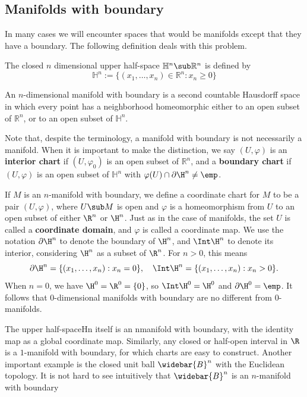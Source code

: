 \subsection{Manifolds with boundary}
In many cases we will encounter spaces that would be manifolds except that they have a boundary. The following definition deals with this problem.\par
The closed $n$ dimensional upper half-space $\mathbb{H}^n\sub\mathbb{R}^n$ is defined by
\[\mathbb{H}^n:=\{(x_1,\dots,x_n)\in\mathbb{R}^n:x_n\geq0\}\]
\begin{definition}
An $n$-dimensional manifold with boundary is a second countable Hausdorff space in which every point has a neighborhood homeomorphic either to an open subset of $\mathbb{R}^n$, or to an open subset of $\mathbb{H}^n$.
\end{definition}
Note that, despite the terminology, a manifold with boundary is not necessarily a manifold. When it is important to make the distinction, we say $(U,\varphi)$ is an \textbf{interior chart} if $(U,\varphi_0)$ is an open subset of $\mathbb{R}^n$, and a \textbf{boundary chart} if $(U,\varphi)$ is an open subset of $\mathbb{H}^n$ with $\varphi(U)\cap\partial\H^n\neq\emp$.\par
If $M$ is an $n$-manifold with boundary, we define a coordinate chart for $M$ to be a pair $(U,\varphi)$, where $U\sub M$ is open and $\varphi$ is a homeomorphism from $U$ to an open subset of either $\R^n$ or $\H^n$. Just as in the case of manifolds, the set $U$ is called a \textbf{coordinate domain}, and $\varphi$ is called a coordinate map. We use the notation $\partial\H^n$ to denote the boundary of $\H^n$, and $\Int\H^n$ to denote its interior, considering $\H^n$ as a subset of $\R^n$. For $n>0$, this means
\[\partial\H^n=\{(x_1,\dots,x_n):x_n=0\},\quad\Int\H^n=\{(x_1,\dots,x_n):x_n>0\}.\]
When $n=0$, we have $\H^0=\R^0=\{0\}$, so $\Int\H^0=\H^0$ and $\partial\H^0=\emp$. It follows that $0$-dimensional manifolds with boundary are no different from $0$-manifolds.
\begin{example}
The upper half-spaceHn itself is an nmanifold with boundary, with the identity map as a global coordinate map. Similarly, any closed or half-open interval in $\R$ is a $1$-manifold with boundary, for which charts are easy to construct. Another important example is the closed unit ball $\widebar{B}^n$ with the Euclidean topology. It is not hard to see intuitively that $\widebar{B}^n$ is an $n$-manifold with boundary
\end{example}

